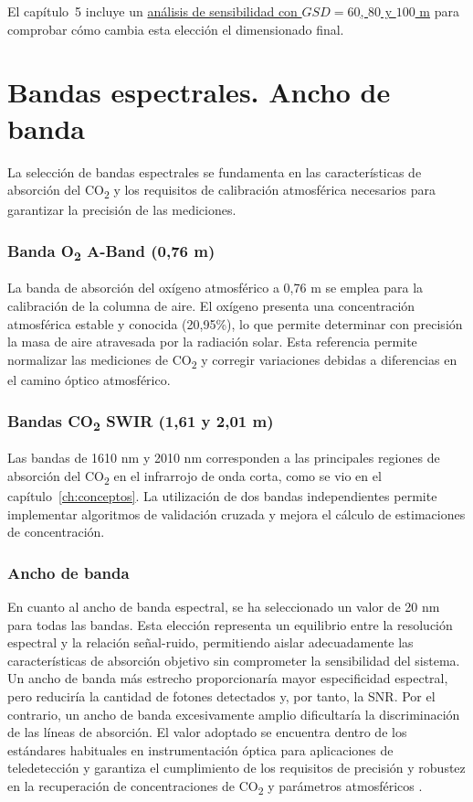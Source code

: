 El capítulo~5 incluye un \hyperref[sec:gsd]{análisis de sensibilidad con \(GSD=60\), \(80\) y \(100\) m} para comprobar cómo cambia esta elección el dimensionado final.


\section{Bandas espectrales. Ancho de banda} \label{sec:specbands}

La selección de bandas espectrales se fundamenta en las características de absorción del CO\textsubscript{2} y los requisitos de calibración atmosférica necesarios para garantizar la precisión de las mediciones.

\subsubsection{Banda O\textsubscript{2} A-Band (0,76 \textmu m)}

La banda de absorción del oxígeno atmosférico a 0,76 \textmu m se emplea para la calibración de la columna de aire. El oxígeno presenta una concentración atmosférica estable y conocida (20,95\%), lo que permite determinar con precisión la masa de aire atravesada por la radiación solar. Esta referencia permite normalizar las mediciones de CO\textsubscript{2} y corregir variaciones debidas a diferencias en el camino óptico atmosférico.

\subsubsection{Bandas CO\textsubscript{2} SWIR (1,61 y 2,01 \textmu m)}

Las bandas de 1610 nm y 2010 nm corresponden a las principales regiones de absorción del CO\textsubscript{2} en el infrarrojo de onda corta, como se vio en el capítulo~\ref{ch:conceptos}. La utilización de dos bandas independientes permite implementar algoritmos de validación cruzada y mejora el cálculo de estimaciones de concentración.

\subsubsection{Ancho de banda}

En cuanto al ancho de banda espectral, se ha seleccionado un valor de 20 nm para todas las bandas. Esta elección representa un equilibrio entre la resolución espectral y la relación señal-ruido, permitiendo aislar adecuadamente las características de absorción objetivo sin comprometer la sensibilidad del sistema. Un ancho de banda más estrecho proporcionaría mayor especificidad espectral, pero reduciría la cantidad de fotones detectados y, por tanto, la SNR. Por el contrario, un ancho de banda excesivamente amplio dificultaría la discriminación de las líneas de absorción. El valor adoptado se encuentra dentro de los estándares habituales en instrumentación óptica para aplicaciones de teledetección y garantiza el cumplimiento de los requisitos de precisión y robustez en la recuperación de concentraciones de CO\textsubscript{2} y parámetros atmosféricos \cite{skoog2017principles}.
\\

